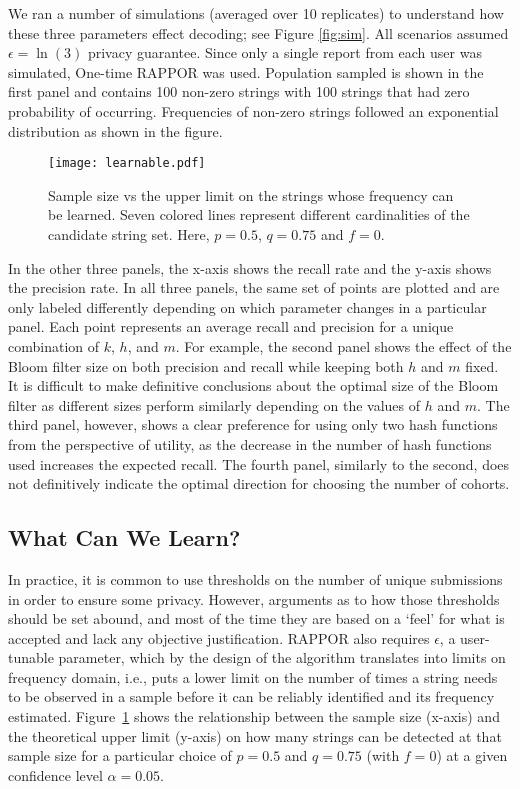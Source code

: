 \documentclass{sig-alternate-2013}
\newcommand\RAPPOR{{RAPPOR}}
\begin{document}
We ran a number of simulations (averaged over 10 replicates) to understand how these three parameters effect decoding; see Figure \ref{fig:sim}. All scenarios assumed $\epsilon = \ln(3)$ privacy guarantee. Since only a single report from each user was simulated, One-time \RAPPOR{} was used. Population sampled is shown in the first panel and contains 100 non-zero strings with 100 strings that had zero probability of occurring. Frequencies of non-zero strings followed an exponential distribution as shown in the figure.

\begin{figure}[t]
\centering
\texttt{[image: learnable.pdf]}
\caption{Sample size vs the upper limit on the strings whose frequency can be learned. Seven colored lines represent different cardinalities of the candidate string set. Here, $p = 0.5$, $q = 0.75$ and $f = 0$.}
\label{fig:learn}
\end{figure}

In the other three panels, the x-axis shows the recall rate and the y-axis shows the precision rate. In all three panels, the same set of points are plotted and are only labeled differently depending on which parameter changes in a particular panel. Each point represents an average recall and precision for a unique combination of $k$, $h$, and $m$. For example, the second panel shows the effect of the Bloom filter size on both precision and recall while keeping both $h$ and $m$ fixed. It is difficult to make definitive conclusions about the optimal size of the Bloom filter as different sizes perform similarly depending on the values of $h$ and $m$. The third panel, however, shows a clear preference for using only two hash functions from the perspective of utility, as the decrease in the number of hash functions used increases the expected recall. The fourth panel, similarly to the second, does not definitively indicate the optimal direction for choosing the number of cohorts. 


\subsection{What Can We Learn?}
In practice, it is common to use thresholds on the number of unique submissions in order to ensure some privacy. However, arguments as to how those thresholds should be set abound, and most
of the time they are based on a `feel' for what is accepted and lack any objective justification. \RAPPOR{} also requires $\epsilon$, a user-tunable parameter, which by the design of the algorithm translates into limits on frequency domain, i.e., puts a lower limit on the number of times a string needs to be observed in a sample before it can be reliably identified and its frequency estimated. Figure~\ref{fig:learn} shows the relationship between the sample size (x-axis) and the theoretical upper limit (y-axis) on how many strings can be detected at that sample size for a particular choice of $p = 0.5$ and $q = 0.75$ (with $f = 0$) at a given confidence level $\alpha = 0.05$.
\end{document}
